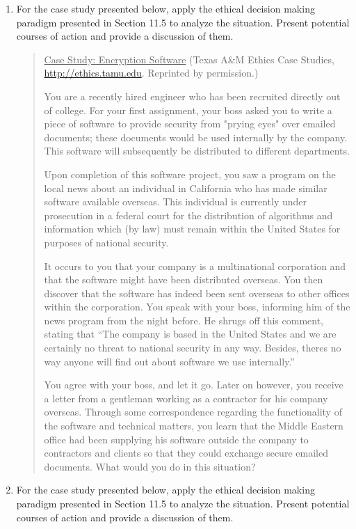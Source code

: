 \begin{enumerate}
\item
  For the case study presented below, apply the ethical decision making
  paradigm presented in Section 11.5 to analyze the situation. Present
  potential courses of action and provide a discussion of them.


\begin{quote}
\ul{Case Study: Encryption Software} (Texas A\&M Ethics Case Studies,
\url{http://ethics.tamu.edu}. Reprinted by permission.)

You are a recently hired engineer who has been recruited directly out of
college. For your first assignment, your boss asked you to write a piece
of software to provide security from "prying eyes" over e­mailed
documents; these documents would be used internally by the company. This
software will subsequently be distributed to different departments.

Upon completion of this software project, you saw a program on the local
news about an individual in California who has made similar software
available overseas. This individual is currently under prosecution in a
federal court for the distribution of algorithms and information which
(by law) must remain within the United States for purposes of national
security.

It occurs to you that your company is a multinational corporation and
that the software might have been distributed overseas. You then
discover that the software has indeed been sent overseas to other
offices within the corporation. You speak with your boss, informing him
of the news program from the night before. He shrugs off this comment,
stating that ``The company is based in the United States and we are
certainly no threat to national security in any way. Besides,
there\textquotesingle s no way anyone will find out about software we
use internally.''

You agree with your boss, and let it go. Later on however, you receive a
letter from a gentleman working as a contractor for his company
overseas. Through some correspondence regarding the functionality of the
software and technical matters, you learn that the Middle Eastern office
had been supplying his software outside the company to contractors and
clients so that they could exchange secure e­mailed documents. What would
you do in this situation?
\end{quote}


\item
  For the case study presented below, apply the ethical decision making
  paradigm presented in Section 11.5 to analyze the situation. Present
  potential courses of action and provide a discussion of them.


\end{enumerate}
